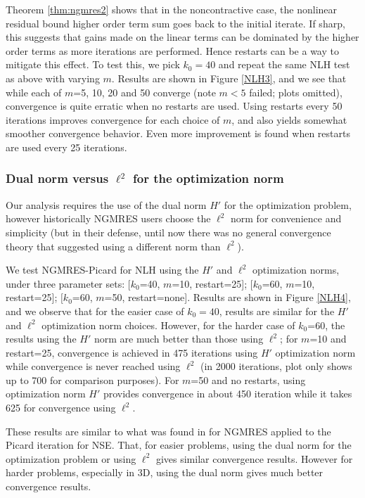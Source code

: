 \documentclass{article}
\numberwithin{equation}{section}
\begin{document}
Theorem \ref{thm:ngmres2} shows that in the noncontractive case, the nonlinear residual bound higher order term sum goes back to the initial iterate.  If sharp, this suggests that gains made on the linear terms can be dominated by the higher order terms as more iterations are performed.  Hence restarts can be a way to mitigate this effect.  To test this, we pick $k_0=40$ and repeat the same NLH test as above with varying $m$.  Results are shown in Figure \ref{NLH3}, and we see that while each of $m$=5, 10, 20 and 50 converge (note $m<5$ failed; plots omitted), convergence is quite erratic when no restarts are used.  Using restarts every 50 iterations improves convergence for each choice of $m$, and also yields somewhat smoother convergence behavior.  Even more improvement is found when restarts are used every 25 iterations.  


\subsubsection{Dual norm versus $\ell^2$ for the optimization norm}

Our analysis requires the use of the dual norm $H'$ for the optimization problem, however historically NGMRES users choose the $\ell^2$ norm for convenience and simplicity (but in their defense, until now there was no general convergence theory that suggested using a different norm than $\ell^2$).  

We test NGMRES-Picard for NLH using the $H'$ and $\ell^2$ optimization norms, under three parameter sets: $[k_0$=40, $m$=10, restart=25]; $[k_0$=60, $m$=10, restart=25]; $[k_0$=60, $m$=50, restart=none].  Results are shown in Figure \ref{NLH4}, and we observe that for the easier case of $k_0=40$, results are similar for the $H'$ and $\ell^2$ optimization norm choices.  However, for the harder case of $k_0$=60, the results using the $H'$ norm are much better than those using $\ell^2$; for $m$=10 and restart=25, convergence is achieved in 475 iterations using $H'$ optimization norm while convergence is never reached using $\ell^2$ (in 2000 iterations, plot only shows up to 700 for comparison purposes).  For $m$=50 and no restarts, using optimization norm $H'$ provides convergence in about 450 iteration while it takes 625 for convergence using $\ell^2$.

These results are similar to what was found in \cite{HR26} for NGMRES applied to the Picard iteration for NSE.  That, for easier problems, using the dual norm for the optimization problem or using $\ell^2$ gives similar convergence results.  However for harder problems, especially in 3D, using the dual norm gives much better convergence results.
\end{document}
